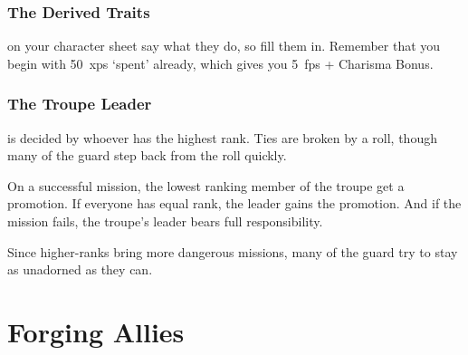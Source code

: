 \begin{multicols}{2}
\begin{multicols}{2}
\end{multicols}

\commonArmourChart

\commonWeaponsChart %
\label{commonWeapons}

\subsubsection{The Derived Traits}
on your character sheet say what they do, so fill them in.
Remember that you begin with 50~\glspl{xp} `spent' already, which gives you 5~\glspl{fp} + Charisma Bonus.

\subsubsection{The Troupe Leader}
is decided by whoever has the highest rank.
Ties are broken by a  roll, though many of the \gls{guard} step back from the roll quickly.

On a successful mission, the lowest ranking member of the troupe get a promotion.
If everyone has equal rank, the leader gains the promotion.
And if the mission fails, the troupe's leader bears full responsibility.

Since higher-ranks bring more dangerous missions, many of the \gls{guard} try to stay as unadorned as they can.

\end{multicols}

\section{Forging Allies}


